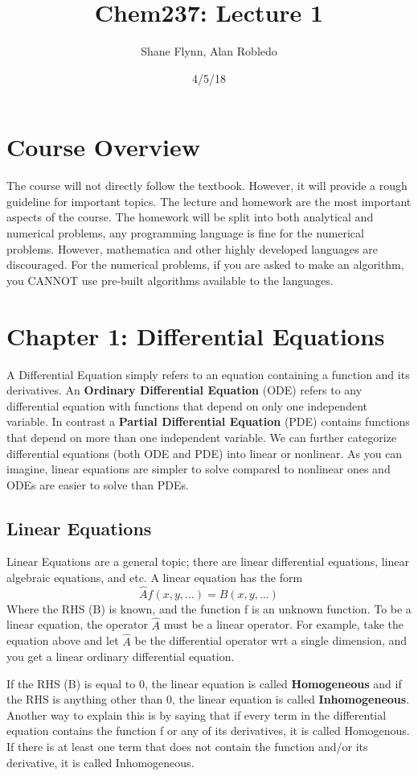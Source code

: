 \documentclass{article}
\title{Chem237: Lecture 1}
\date{4/5/18}
\author{Shane Flynn, Alan Robledo}
\newcommand{\be}{\begin{equation}}
\newcommand{\ee}{\end{equation}}
\begin{document}
\maketitle
\section*{Course Overview}
The course will not directly follow the textbook. However, it will provide a rough guideline for important topics.
The lecture and homework are the most important aspects of the course.
The homework will be split into both analytical and numerical problems, any programming language is fine for the numerical problems. However, mathematica and other highly developed languages are discouraged.
For the numerical problems, if you are asked to make an algorithm, you CANNOT use pre-built algorithms available to the languages.

\section*{Chapter 1: Differential Equations}
A Differential Equation simply refers to an equation containing a function and its derivatives.
An \textbf{Ordinary Differential Equation} (ODE) refers to any differential equation with functions that depend on only one independent variable.
In contrast a \textbf{Partial Differential Equation} (PDE) contains functions that depend on more than one independent variable.
We can further categorize differential equations (both ODE and PDE) into linear or nonlinear.
As you can imagine, linear equations are simpler to solve compared to nonlinear ones and ODEs are easier to solve than PDEs.

\subsection*{Linear Equations}
Linear Equations are a general topic; there are linear differential equations, linear algebraic equations, and etc.
A linear equation has the form
\be
\hat{A} f(x,y,\hdots) = B(x,y,\hdots)
\ee
Where the RHS (B) is known, and the function f is an unknown function.
To be a linear equation, the operator $\hat{A}$ must be a linear operator.
For example, take the equation above and let $\hat{A}$ be the differential operator wrt a single dimension, and you get a linear ordinary differential equation.

If the RHS (B) is equal to 0, the linear equation is called \textbf{Homogeneous} and if the RHS is anything other than 0, the linear equation is called \textbf{Inhomogeneous}.
Another way to explain this is by saying that if every term in the differential equation contains the function f or any of its derivatives, it is called Homogenous.
If there is at least one term that does not contain the function and/or its derivative, it is called Inhomogeneous.
\end{document}
